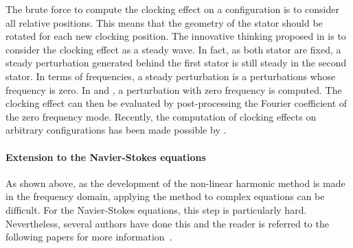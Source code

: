 The brute force to compute the clocking effect on a
configuration is to consider all relative positions. This means
that the geometry of the stator should be rotated for each new 
clocking position. The innovative thinking proposed in 
\citet{He2002} is to consider the clocking effect as a steady wave.
In fact, as both stator are fixed, a steady perturbation
generated behind the first stator is still steady in the second stator.
In terms of frequencies, a steady perturbation is a perturbations 
whose frequency is zero. In \citet{He2002} and \citet{Vilmin2009}, 
a perturbation with zero frequency
is computed. The clocking effect can then be evaluated by
post-processing the Fourier coefficient of the zero frequency mode.
Recently, the computation of clocking effects on
arbitrary configurations has been made possible
by \citet{Vilmin2013a}.

\paragraph{Extension to the Navier-Stokes equations}
As shown above, as the development of the non-linear harmonic
method is made in the frequency domain, applying the method to
complex equations can be difficult. For the Navier-Stokes equations,
this step is particularly hard. Nevertheless, several authors have
done this and the reader is referred to the following papers
for more information~\cite{He1998, Chen2001, He2002, Vilmin2006}.

